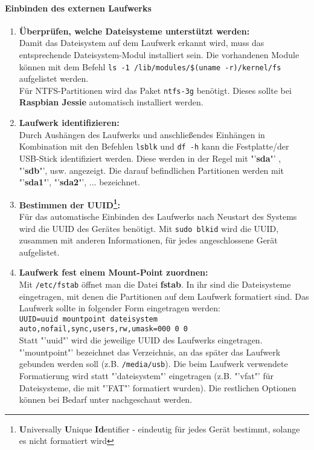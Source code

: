 \paragraph{Einbinden des externen Laufwerks}

\begin{enumerate}
	\item \textbf{Überprüfen, welche Dateisysteme unterstützt werden: } \\
	Damit das Dateisystem auf dem Laufwerk erkannt wird, muss das entsprechende Dateisystem-Modul installiert sein. Die vorhandenen Module können mit dem Befehl \texttt{ls -1 /lib/modules/\$(uname -r)/kernel/fs} aufgelistet werden.\\
	Für NTFS-Partitionen wird das Paket \texttt{ntfs-3g} benötigt. Dieses sollte bei \textbf{Raspbian Jessie} automatisch installiert werden.
	\item \textbf{Laufwerk identifizieren: } \\
	Durch Aushängen des Laufwerks und anschließendes Einhängen in Kombination mit den Befehlen \texttt{lsblk} und \texttt{df -h} kann die Festplatte/der USB-Stick identifiziert werden.
	Diese werden in der Regel mit "'\textbf{sda}"' , "'\textbf{sdb}"', usw. angezeigt. Die darauf befindlichen Partitionen werden mit "'\textbf{sda1}"', "'\textbf{sda2}"', ... bezeichnet.
	\item \textbf{Bestimmen der UUID\footnote{\textbf{U}niversally \textbf{U}nique \textbf{Id}entifier - eindeutig für jedes Gerät bestimmt, solange es nicht formatiert wird}: }\\
	Für das automatische Einbinden des Laufwerks nach Neustart des Systems wird die UUID des Gerätes benötigt. Mit \texttt{sudo blkid} wird die UUID, zusammen mit anderen Informationen, für jedes angeschlossene Gerät aufgelistet.
	\item{\textbf{Laufwerk fest einem Mount-Point zuordnen: }\\
		Mit \texttt{/etc/fstab} öffnet man die Datei \textbf{fstab}. In ihr sind die Dateisysteme eingetragen, mit denen die Partitionen auf dem Laufwerk formatiert sind. 
		Das Laufwerk sollte in folgender Form eingetragen werden: \\
		\texttt{\small UUID=uuid mountpoint dateisystem auto,nofail,sync,users,rw,umask=000   0   0
		}\\
		Statt "'uuid"' wird die jeweilige UUID des Laufwerks eingetragen.
		"'mountpoint"' bezeichnet das Verzeichnis, an das später das Laufwerk gebunden werden soll (z.B. \texttt{/media/usb}). Die beim Laufwerk verwendete Formatierung wird statt "'dateisystem"' eingetragen (z.B. "'vfat"' für Dateisysteme, die mit "'FAT"' formatiert wurden). Die restlichen Optionen können bei Bedarf unter \cite{c6} nachgeschaut werden.}
	

\end{enumerate}
